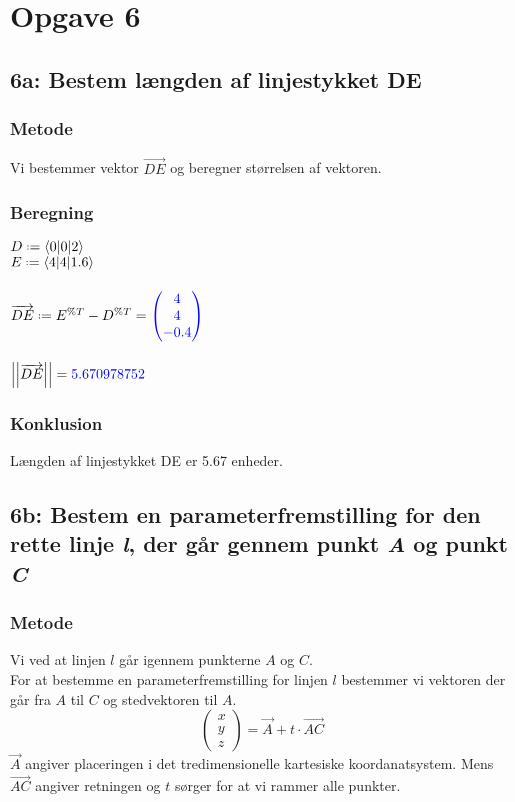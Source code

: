 \documentclass[../main.tex]{subfiles}
\begin{document}
\section*{Opgave 6}
\subsection*{6a: Bestem længden af linjestykket DE}
    \subsubsection*{Metode}
    Vi bestemmer vektor \(\overrightarrow{DE}\) og beregner størrelsen af vektoren.
    \subsubsection*{Beregning}
    \(D \defeq \langle 0|0|2 \rangle\)\\
    \(E \defeq \langle 4|4|1.6 \rangle\)\\\\
    \(\overrightarrow{DE} \defeq E^{\%T}-D^{\%T} = \textcolor{blue}{\begin{pmatrix} 4\\ 4\\ -0.4 \end{pmatrix}}\)\\\\
    \(\left|\left| \overrightarrow{DE} \right|\right| = \textcolor{blue}{5.670978752}\)
    \subsubsection*{Konklusion}
    Længden af linjestykket DE er 5.67 enheder.
\clearpage
\subsection*{6b: Bestem en parameterfremstilling for den rette linje \textit{l}, der går gennem punkt \textit{A} og punkt \textit{C}}
    \subsubsection*{Metode}
        Vi ved at linjen \(l\) går igennem punkterne \(A\) og \(C\).\\
        For at bestemme en parameterfremstilling for linjen \(l\) bestemmer vi vektoren der går fra \(A\) til \(C\) og stedvektoren til \(A\).\\
        \[\begin{pmatrix} x\\y\\z \end{pmatrix}=\overrightarrow{A}+t\cdot \overrightarrow{AC}\]
        \(\overrightarrow{A}\) angiver placeringen i det tredimensionelle kartesiske koordanatsystem. Mens \(\overrightarrow{AC}\) angiver retningen og \(t\) sørger for at vi rammer alle punkter.
\end{document}
